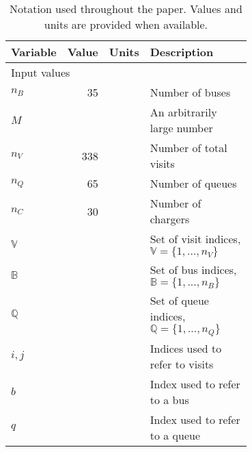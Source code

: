 \documentclass[utf8]{FrontiersinHarvard}
\newcommand{\EDIT}[1]{{\color{blue}#1}}                                         %
\begin{document}
\begin{table}[!htpb]
  \caption{Notation used throughout the paper. \EDIT{Values and units} are provided when available.}
  \label{tab:variables}
  \centering
  \begin{tabularx}{\textwidth}{l r l p{0.7\linewidth}}
    \toprule \textbf{Variable} & \textbf{Value} & \textbf{Units} & \textbf{Description}                                                          \\
    \toprule \multicolumn{4}{l}{Input values}                                                                                                    \\
    \hline $n_B$     &\EDIT{35} &       & Number of buses                                                                                        \\
    $M$              & &       & An arbitrarily large number                                                                                     \\
    $n_V$            & \EDIT{338} &       & Number of total visits                                                                               \\
    $n_Q$            & \EDIT{65} &       & Number of queues                                                                                      \\
    $n_C$            & \EDIT{30} &       & Number of chargers                                                                                    \\
    $\mathbb{V}$     & &       & Set of visit indices, $\mathbb{V} = \{1, ..., n_V\}$                                                            \\
    $\mathbb{B}$     & &       & Set of bus indices, $\mathbb{B} = \{1, ..., n_B\}$                                                              \\
    $\mathbb{Q}$              & &       & Set of queue indices, $\mathbb{Q} = \{1, ..., n_Q\}$                                                                     \\
    $i,j$            & &       & Indices used to refer to visits                                                                                 \\
    $b$              & &       & Index used to refer to a bus                                                                                    \\
    $q$              & &       & Index used to refer to a queue                                                                                  \\

\end{tabularx}
\end{table}
\end{document}
